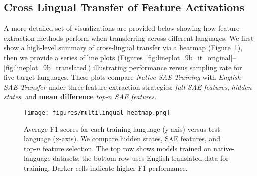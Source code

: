 

\FloatBarrier

\subsection{Cross Lingual Transfer of Feature Activations}
\label{app:cross_lingual_features}
A more detailed set of visualizations are provided below showing how feature extraction methods perform when transferring across different languages. We first show a high-level summary of cross-lingual transfer via a heatmap (Figure~\ref{fig:multilingual_heatmap}), then we provide a series of line plots (Figures~\ref{fig:lineplot_9b_it_original}--\ref{fig:lineplot_9b_translated}) illustrating performance versus sampling rate for five target languages. These plots compare \emph{Native SAE Training} with \emph{English SAE Transfer} under three feature extraction strategies: \emph{full SAE features}, \emph{hidden states}, and \textbf{mean difference} \emph{top-$n$ SAE features}. 


\begin{figure}[ht]
    \centering
    \texttt{[image: figures/multilingual\_heatmap.png]}
    \caption{Average F1 scores for each training language (y-axis) versus test language (x-axis). 
    We compare hidden states, SAE features, and top-$n$ feature selection. 
    The top row shows models trained on native-language datasets; 
    the bottom row uses English-translated data for training. 
    Darker cells indicate higher F1 performance.}
    \label{fig:multilingual_heatmap}
\end{figure}

